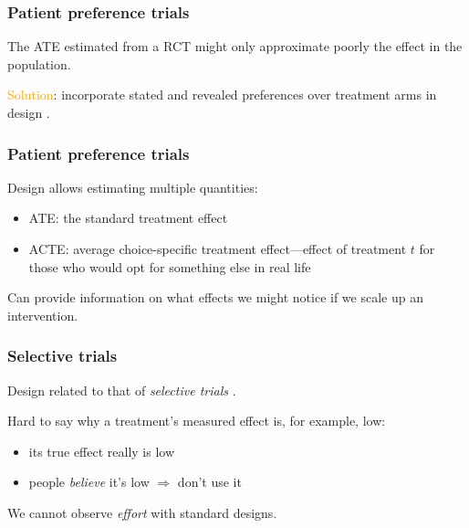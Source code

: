 \documentclass[12pt,english,dvipsnames,aspectratio=169,handout]{beamer}\usepackage[]{graphicx}\usepackage[]{xcolor}
\begin{document}
\begin{frame}
	\frametitle{Patient preference trials}
	The ATE estimated from a RCT might only approximate poorly the effect in the population.\bigskip
	\pause
	
	\textcolor{orange}{Solution}: incorporate stated and revealed preferences over treatment arms in design \cite{knox_design_2019}.
	
	\begin{figure}
		\centering
	\end{figure}
		
\end{frame}


\begin{frame}
	\frametitle{Patient preference trials}
	Design allows estimating multiple quantities:
	
	\begin{itemize}
		\item ATE: the standard treatment effect\pause
		\item ACTE: average choice-specific treatment effect---effect of treatment $t$ for those who would opt for something else in real life
	\end{itemize}\bigskip
	\pause
	
	Can provide information on what effects we might notice if we scale up an intervention.
	
\end{frame}


\begin{frame}
	\frametitle{Selective trials}
	Design related to that of \textit{selective trials} \cite{chassang_selective_2012}.\bigskip
	
	Hard to say why a treatment's measured effect is, for example, low:
	
	\begin{itemize}
		\item its true effect really is low\pause
		\item people \textit{believe} it's low $\Rightarrow$ don't use it
	\end{itemize}\bigskip
	\pause
	
	We cannot observe \textit{effort} with standard designs.
	
\end{frame}
\end{document}
